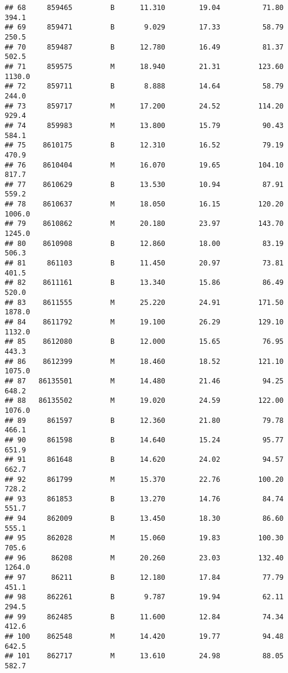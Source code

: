 \documentclass[
]{article}
\begin{document}
\begin{verbatim}
## 68     859465         B      11.310        19.04          71.80     394.1
## 69     859471         B       9.029        17.33          58.79     250.5
## 70     859487         B      12.780        16.49          81.37     502.5
## 71     859575         M      18.940        21.31         123.60    1130.0
## 72     859711         B       8.888        14.64          58.79     244.0
## 73     859717         M      17.200        24.52         114.20     929.4
## 74     859983         M      13.800        15.79          90.43     584.1
## 75    8610175         B      12.310        16.52          79.19     470.9
## 76    8610404         M      16.070        19.65         104.10     817.7
## 77    8610629         B      13.530        10.94          87.91     559.2
## 78    8610637         M      18.050        16.15         120.20    1006.0
## 79    8610862         M      20.180        23.97         143.70    1245.0
## 80    8610908         B      12.860        18.00          83.19     506.3
## 81     861103         B      11.450        20.97          73.81     401.5
## 82    8611161         B      13.340        15.86          86.49     520.0
## 83    8611555         M      25.220        24.91         171.50    1878.0
## 84    8611792         M      19.100        26.29         129.10    1132.0
## 85    8612080         B      12.000        15.65          76.95     443.3
## 86    8612399         M      18.460        18.52         121.10    1075.0
## 87   86135501         M      14.480        21.46          94.25     648.2
## 88   86135502         M      19.020        24.59         122.00    1076.0
## 89     861597         B      12.360        21.80          79.78     466.1
## 90     861598         B      14.640        15.24          95.77     651.9
## 91     861648         B      14.620        24.02          94.57     662.7
## 92     861799         M      15.370        22.76         100.20     728.2
## 93     861853         B      13.270        14.76          84.74     551.7
## 94     862009         B      13.450        18.30          86.60     555.1
## 95     862028         M      15.060        19.83         100.30     705.6
## 96      86208         M      20.260        23.03         132.40    1264.0
## 97      86211         B      12.180        17.84          77.79     451.1
## 98     862261         B       9.787        19.94          62.11     294.5
## 99     862485         B      11.600        12.84          74.34     412.6
## 100    862548         M      14.420        19.77          94.48     642.5
## 101    862717         M      13.610        24.98          88.05     582.7

\end{verbatim}
\end{document}
